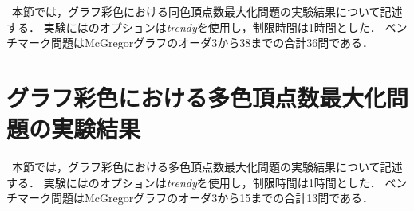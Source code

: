 \, 本節では，グラフ彩色における同色頂点数最大化問題の実験結果について記述する．
実験には{\clingo}のオプションは\textit{trendy}を使用し，制限時間は1時間とした．
ベンチマーク問題はMcGregorグラフのオーダ3から38までの合計36問である．

\section{グラフ彩色における多色頂点数最大化問題の実験結果}

\, 本節では，グラフ彩色における多色頂点数最大化問題の実験結果について記述する．
実験には{\clingo}のオプションは\textit{trendy}を使用し，制限時間は1時間とした．
ベンチマーク問題はMcGregorグラフのオーダ3から15までの合計13問である．

